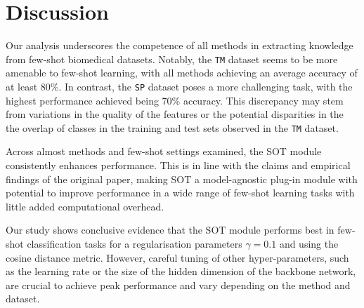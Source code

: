 \section{Discussion}

Our analysis underscores the competence of all methods in extracting knowledge from few-shot biomedical datasets. Notably, the \texttt{TM} dataset seems to be more amenable to few-shot learning, with all methods achieving an average accuracy of at least 80\%. In contrast, the \texttt{SP} dataset poses a more challenging task, with the highest performance achieved being 70\% accuracy. This discrepancy may stem from variations in the quality of the features or the potential disparities in the the overlap of classes in the training and test sets observed in the \texttt{TM} dataset.

Across almost methods and few-shot settings examined, the SOT module consistently enhances performance. This is in line with the claims and empirical findings of the original paper, making SOT a model-agnostic plug-in module with potential to improve performance in a wide range of few-shot learning tasks with little added computational overhead.

Our study shows conclusive evidence that the SOT module performs best in few-shot classification tasks for a regularisation parameters $\gamma = 0.1$ and using the cosine distance metric. However, careful tuning of other hyper-parameters, such as the learning rate or the size of the hidden dimension of the backbone network, are crucial to achieve peak performance and vary depending on the method and dataset.
